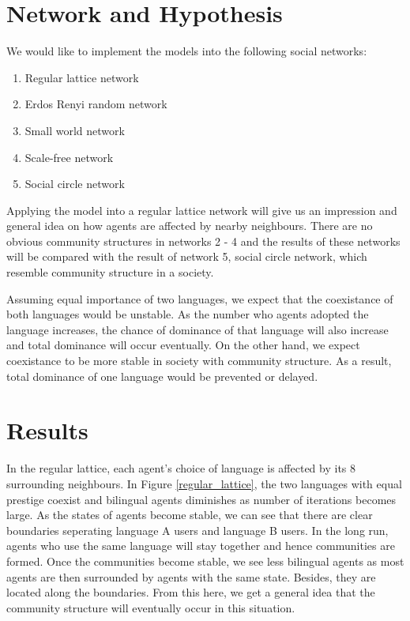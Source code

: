 \documentclass[a4paper, 11pt]{article}
\begin{document}
\section{Network and Hypothesis}
We would like to implement the models into the following social networks:
\begin{enumerate}
  \item Regular lattice network  
  \item Erdos Renyi random network 
  \item Small world network \cite{watts1998collective}
  \item Scale-free network \cite{barabasi1999emergence}
  \item Social circle network
\end{enumerate}
Applying the model into a regular lattice network will give us an impression and general idea on how agents are affected by nearby neighbours. There are no obvious community structures in networks 2 - 4 and the results of these networks will be compared with the result of network 5, social circle network, which resemble community structure in a society.

Assuming equal importance of two languages, we expect that the coexistance of both languages would be unstable. As the number who agents adopted the language increases, the chance of dominance of that language will also increase and total dominance will occur eventually. On the other hand, we expect coexistance to be more stable in society with community structure\cite{saha2015complex}. As a result, total dominance of one language would be prevented or delayed. 

\section{Results}
In the regular lattice, each agent's choice of language is affected by its 8 surrounding neighbours. In Figure \ref{regular_lattice}, the two languages with equal prestige coexist and bilingual agents diminishes as number of iterations becomes large. As the states of agents become stable, we can see that there are clear boundaries seperating language A users and language B users. In the long run, agents who use the same language will stay together and hence communities are formed. Once the communities become stable, we see less bilingual agents as most agents are then surrounded by agents with the same state. Besides, they are located along the boundaries. From this here, we get a general idea that the community structure will eventually occur in this situation.
\end{document}
